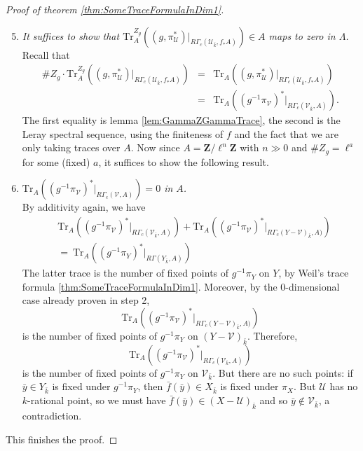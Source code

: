 \begin{proof}[Proof of theorem \ref{thm:SomeTraceFormulaInDim1}]
\begin{enumerate}
\setcounter{enumi}{4}
\item 
{\it  
It suffices to show that  $\text{Tr}_A^{Z_g}\left((g, \pi_\mathcal{U}^*)\big|_{R\Gamma_c(\mathcal{U}_{\bar k}, f_*A)}\right) \in A$ maps to zero in $\Lambda$. 
}\\
Recall that 
\begin{eqnarray*}
\# Z_g \cdot \text{Tr}_A^{Z_g}\left((g, \pi_\mathcal{U}^*)\big|_{R\Gamma_c(\mathcal{U}_{\bar k}, f_*A)}\right) 
& = & \text{Tr}_A\left((g, \pi_\mathcal{U}^*)\big|_{R\Gamma_c(\mathcal{U}_{\bar k}, f_*A)}\right)\\
& = & \text{Tr}_A\left((g^{-1}\pi_\mathcal{V})^*\big|_{R\Gamma_c(\mathcal{V}_{\bar k}, A)}\right).
\end{eqnarray*}
The first equality is lemma \ref{lem:GammaZGammaTrace}, the second is the Leray spectral sequence, using the finiteness of $f$ and the fact that we are only taking traces over $A$. Now since $A=\mathbf{Z}/\ell^n\mathbf{Z}$ with $n\gg 0$ and $\# Z_g=\ell^a$ for some (fixed) $a$, it suffices to show the following result.
\item
{\it $\text{Tr}_A\left((g^{-1}\pi_\mathcal{V})^*\big|_{R\Gamma_c(\mathcal{V}, A)}\right) = 0$ in $A$.} \\
By additivity again, we have
\begin{eqnarray*}
&  \text{Tr}_A\left((g^{-1}\pi_\mathcal{V})^*\big|_{R\Gamma_c(\mathcal{V}_{\bar k}, A)}\right)+\text{Tr}_A\left((g^{-1}\pi_\mathcal{V})^*\big|_{R\Gamma_c(Y-\mathcal{V})_{\bar k}, A)}\right) 
\\
& = \ \text{Tr}_A\left((g^{-1}\pi_Y)^*\big|_{R\Gamma(Y_{\bar k}, A)}\right)
\end{eqnarray*}
The latter trace is the number of fixed points of $g^{-1}\pi_Y$ on $Y$, by Weil's trace formula \ref{thm:SomeTraceFormulaInDim1}. Moreover, by the 0-dimensional case already proven in step 2, 
$$
\text{Tr}_A\left((g^{-1}\pi_\mathcal{V})^*\big|_{R\Gamma_c(Y-\mathcal{V})_{\bar k}, A)}\right)
$$ 
is the number of fixed points of $g^{-1}\pi_Y$ on $(Y-\mathcal{V})_{\bar k}$. Therefore, 
$$
\text{Tr}_A\left((g^{-1}\pi_\mathcal{V})^*\big|_{R\Gamma_c(\mathcal{V}_{\bar k}, A)}\right)
$$ 
is the number of fixed points of $g^{-1}\pi_Y$ on $\mathcal{V}_{\bar k}$. But there are no such points: if $\bar y\in Y_{\bar k}$ is fixed under $g^{-1}\pi_Y$, then $\bar f(\bar y) \in X_{\bar k}$ is fixed under $\pi_X$. But $\mathcal{U}$ has no $k$-rational point, so we must have $\bar f(\bar y)\in (X-\mathcal{U})_{\bar k}$ and so $\bar y\notin \mathcal{V}_{\bar k}$, a contradiction. 
\end{enumerate}
This finishes the proof.
\end{proof}

